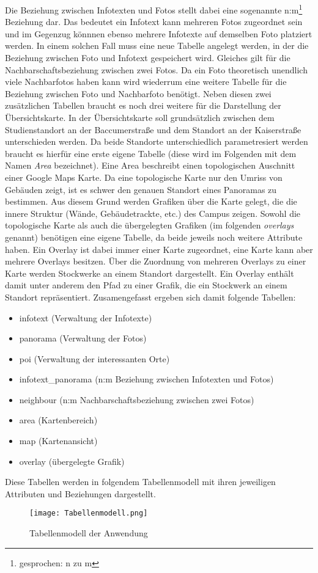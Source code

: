Die Beziehung zwischen Infotexten und Fotos stellt dabei eine sogenannte n:m\footnote{gesprochen: n zu m} Beziehung dar.
Das bedeutet ein Infotext kann mehreren Fotos zugeordnet sein und im Gegenzug könnnen ebenso mehrere Infotexte auf demselben Foto platziert werden. In einem solchen Fall muss eine neue Tabelle angelegt werden, in der die Beziehung zwischen Foto und Infotext gespeichert wird. Gleiches gilt für die Nachbarschaftsbeziehung zwischen zwei Fotos. Da ein Foto theoretisch unendlich viele Nachbarfotos haben kann wird wiederrum eine weitere Tabelle für die Beziehung zwischen Foto und Nachbarfoto benötigt. Neben diesen zwei zusätzlichen Tabellen braucht es noch drei weitere für die Darstellung der Übersichtskarte. In der Übersichtskarte soll grundsätzlich zwischen dem Studienstandort an der Baccumerstraße und dem Standort an der Kaiserstraße unterschieden werden. Da beide Standorte unterschiedlich parametresiert werden braucht es hierfür eine erste eigene Tabelle (diese wird im Folgenden mit dem Namen \textit{Area} bezeichnet). Eine Area beschreibt einen topologischen Auschnitt einer Google Maps Karte. Da eine topologische Karte nur den Umriss von Gebäuden zeigt, ist es schwer den genauen Standort eines Panoramas zu bestimmen. Aus diesem Grund werden Grafiken über die Karte gelegt, die die innere Struktur (Wände, Gebäudetrackte, etc.) des Campus zeigen. Sowohl die topologische Karte als auch die übergelegten Grafiken (im folgenden \textit{overlays} genannt) benötigen eine eigene Tabelle, da beide jeweils noch weitere Attribute haben. Ein Overlay ist dabei immer einer Karte zugeordnet, eine Karte kann aber mehrere Overlays besitzen. Über die Zuordnung von mehreren Overlays zu einer Karte werden Stockwerke an einem Standort dargestellt. Ein Overlay enthält damit unter anderem den Pfad zu einer Grafik, die ein Stockwerk an einem Standort repräsentiert. Zusamengefasst ergeben sich damit folgende Tabellen:

\begin{itemize}
  \item infotext (Verwaltung der Infotexte)
  \item panorama (Verwaltung der Fotos)
  \item poi (Verwaltung der interessanten Orte)
  \item infotext\_panorama (n:m Beziehung zwischen Infotexten und Fotos)
  \item neighbour (n:m Nachbarschaftsbeziehung zwischen zwei Fotos)
  \item area (Kartenbereich)
  \item map (Kartenansicht)
  \item overlay (übergelegte Grafik)
\end{itemize}

Diese Tabellen werden in folgendem Tabellenmodell mit ihren jeweiligen Attributen und Beziehungen dargestellt.

\begin{figure}[htb]
\centering
\texttt{[image: Tabellenmodell.png]}
\caption[Tabellenmodell der Anwendung]{Tabellenmodell der Anwendung\protect\footnotemark}
\label{fig:Tabellenmodell}
\end{figure}
